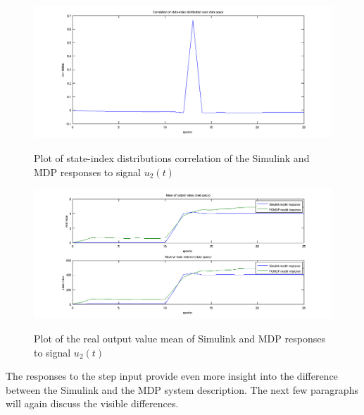 \begin{figure}[h!]
\begin{center}
\includegraphics[width=18cm]{media/bw/bw_val_step_state_corr}\\
\end{center}
\caption{Plot of state-index distributions correlation of the Simulink and MDP responses to signal $u_2(t)$}
\label{bw_val_step_state_corr}
\end{figure}

\begin{figure}[h!]
\begin{center}
\includegraphics[width=18cm]{media/bw/bw_val_step_real_mean}\\
\end{center}
\caption{Plot of the real output value mean of Simulink and MDP responses to signal $u_2(t)$}
\label{bw_val_step_real_mean}
\end{figure}

The responses to the step input provide even more insight into the difference between the Simulink and the MDP system description. The next few paragraphs will again discuss the visible differences.


